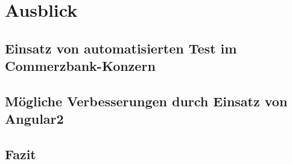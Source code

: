 \section{Ausblick}
\subsection{Einsatz von automatisierten Test im Commerzbank-Konzern}

\subsection{Mögliche Verbesserungen durch Einsatz von Angular2}

\subsection{Fazit}